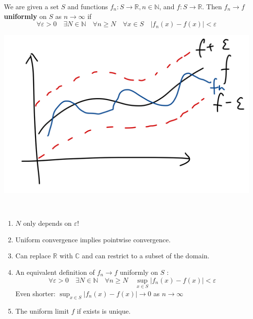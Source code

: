 \documentclass[a4paper]{article}
\renewcommand{\epsilon}{\varepsilon}
\begin{document}
\begin{definition}
    We are given a set $S$ and functions $f_{n}: S \rightarrow \mathbb{R}, n \in \mathbb{N}$, and $f: S \rightarrow \mathbb{R}$. Then $f_{n} \rightarrow f$ \textbf{uniformly} on $S$ as $n \rightarrow \infty$ if
    \[
    \forall \varepsilon>0 \quad \exists N \in \mathbb{N} \quad \forall n \geqslant N \quad \forall x \in S \quad\left|f_{n}(x)-f(x)\right|<\varepsilon
    \]
    \begin{center}
        \includegraphics[scale=0.11]{at1.jpeg}
    \end{center}
\end{definition}

\begin{remark}\
    \begin{enumerate}
        \item $ N $ only depends on $\epsilon$!
        \item Uniform convergence implies pointwise convergence.
        \item Can replace $\mathbb{R}$ with $\mathbb{C}$ and can restrict to a subset of the domain.
        \item An equivalent definition of $f_{n} \rightarrow f$ uniformly on $S$ :
        \[
        \forall \varepsilon>0 \quad \exists N \in \mathbb{N} \quad \forall n \geqslant N \quad \sup _{x \in S}\left|f_{n}(x)-f(x)\right|<\varepsilon
        \]
        Even shorter: $\sup _{x \in S}\left|f_{n}(x)-f(x)\right| \rightarrow 0$ as $n \rightarrow \infty$
        \item The uniform limit $f$ if exists is unique.
    \end{enumerate}
\end{remark}
\end{document}
